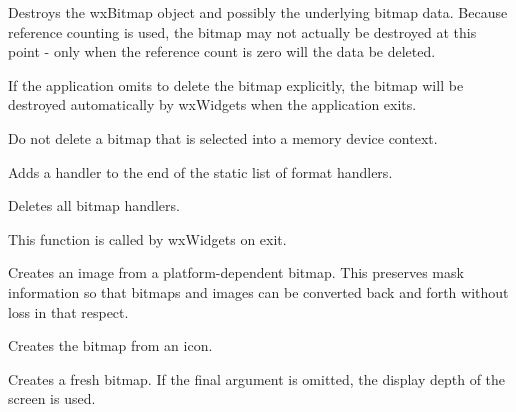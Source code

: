 Destroys the wxBitmap object and possibly the underlying bitmap data.
Because reference counting is used, the bitmap may not actually be
destroyed at this point - only when the reference count is zero will the
data be deleted.

If the application omits to delete the bitmap explicitly, the bitmap will be
destroyed automatically by wxWidgets when the application exits.

Do not delete a bitmap that is selected into a memory device context.

\label{wxbitmapaddhandler}


Adds a handler to the end of the static list of format handlers.






Deletes all bitmap handlers.

This function is called by wxWidgets on exit.

\label{wxbitmapconverttoimage}


Creates an image from a platform-dependent bitmap. This preserves
mask information so that bitmaps and images can be converted back
and forth without loss in that respect.

\label{wxbitmapcopyfromicon}


Creates the bitmap from an icon.

\label{wxbitmapcreate}


Creates a fresh bitmap. If the final argument is omitted, the display depth of
the screen is used.


